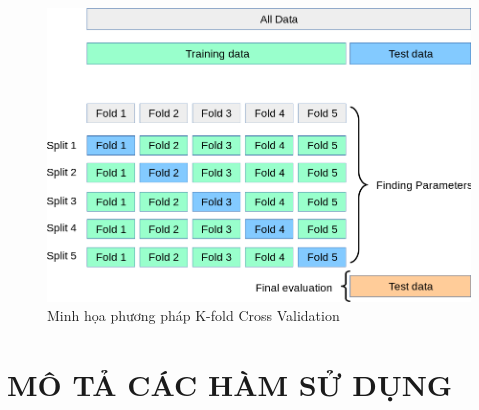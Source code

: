 \documentclass{report}
\begin{document}
\begin{itemize}
\begin{itemize}
                \begin{figure}[H]
                    \includegraphics[width=\textwidth, keepaspectratio]{assets/grid_search_cross_validation.png}
                    \centering
                    \caption{Minh họa phương pháp K-fold Cross Validation}
                \end{figure}
                
            \end{itemize}
    \end{itemize}

\section{MÔ TẢ CÁC HÀM SỬ DỤNG}
\end{document}
